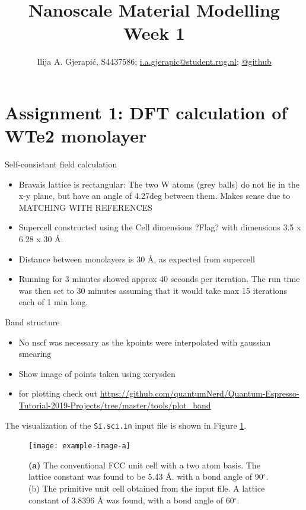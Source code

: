 \documentclass[10pt,a4paper]{labreport}
\title{Nanoscale Material Modelling
\\
\normalsize{Week 1}} %
\author{Ilija A. Gjerapić, S4437586; \href{mailto:i.a.gjerapic@student.rug.nl}{i.a.gjerapic@student.rug.nl}; \href{https://github.com/igjerapic/nmm-week1/}{@github} } %
\begin{document}
\maketitle



  

\thispagestyle{firststyle}
\newpage
\section{Assignment 1: DFT calculation of WTe2 monolayer}
Self-consistant field calculation
\begin{itemize}
    \item Bravais lattice is rectangular: The two W atoms (grey balls) do not lie in the x-y plane, but have an angle of 4.27deg between them. Makes sense due to {\color{red} MATCHING WITH REFERENCES}
  
    \item Supercell constructed using the Cell dimensions ?Flag? with dimensions 3.5 x 6.28 x 30 \AA. 
    \item Distance between monolayers is 30 \AA, as expected from supercell
    \item Running for 3 minutes showed approx 40 seconds per iteration. The run time was then set to 30 minutes assuming that it would take max 15 iterations each of 1 min long. 
  \end{itemize}

  Band structure
  \begin{itemize}
    \item No nscf was necessary as the kpoints were interpolated with gaussian smearing
    \item Show image of points taken using xcrysden
    \item for plotting check out \url{https://github.com/quantumNerd/Quantum-Espresso-Tutorial-2019-Projects/tree/master/tools/plot_band} 
  \end{itemize}
  The visualization of the \texttt{Si.sci.in} input file is shown in Figure \ref{fig:ass1_cryst}. 
  \begin{figure}[h]
    \centering 
    \texttt{[image: example-image-a]}
    \caption{\textbf{(a)} The conventional FCC unit cell with a two atom basis. The lattice constant was found to be 5.43 \AA. with a bond angle of 90$^\circ$. (b) The primitive unit cell obtained from the input file. A lattice constant of 3.8396 {\AA} was found, with a bond angle of 60$^\circ$.}
    \label{fig:ass1_cryst}
  \end{figure}
\end{document}
